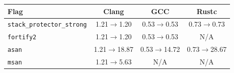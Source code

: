 \begin{tabular*}{\columnwidth}{@{\extracolsep\fill}lccc@{\extracolsep\fill}}
\toprule
\textbf{Flag} & \textbf{Clang} & \textbf{GCC} & \textbf{Rustc} \\
\midrule
\texttt{stack\_protector\_strong} & 1.21$\to$1.20 & 0.53$\to$0.53 & 0.73$\to$0.73 \\
\texttt{fortify2} & 1.21$\to$1.20 & 0.53$\to$0.53 & N/A \\
\texttt{asan} & 1.21$\to$18.87 & 0.53$\to$14.72 & 0.73$\to$28.67 \\
\texttt{msan} & 1.21$\to$5.63 & N/A & N/A \\
\bottomrule
\end{tabular*}
